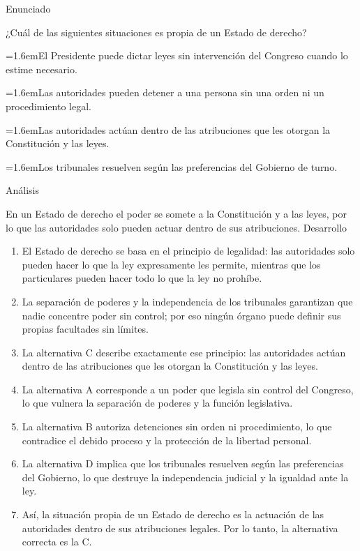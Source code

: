\documentclass[10pt,a4paper,twocolumn]{article}
\newcommand{\alternativa}[2]{\par\noindent\hangindent=1.6em\hangafter=1\makebox[1.6em][l]{\tecla{#1}}#2\par}
\newcommand{\clave}[1]{\par\smallskip{\sffamily\footnotesize\color{esmeralda} Clave \teclaok{#1}}\par}
\begin{document}
\begin{ejemplo}
{\sffamily\footnotesize\color{zinc500} Enunciado}\par
¿Cuál de las siguientes situaciones es propia de un Estado de derecho?
\alternativa{A}{El Presidente puede dictar leyes sin intervención del Congreso cuando lo estime necesario.}
\alternativa{B}{Las autoridades pueden detener a una persona sin una orden ni un procedimiento legal.}
\alternativa{C}{Las autoridades actúan dentro de las atribuciones que les otorgan la Constitución y las leyes.}
\alternativa{D}{Los tribunales resuelven según las preferencias del Gobierno de turno.}
\clave{C}
{\sffamily\footnotesize\color{zinc500} Análisis}\par En un Estado de derecho el poder se somete a la Constitución y a las leyes, por lo que las autoridades solo pueden actuar dentro de sus atribuciones.
{\sffamily\footnotesize\color{zinc500} Desarrollo}
\begin{enumerate}
  \item El Estado de derecho se basa en el principio de legalidad: las autoridades solo pueden hacer lo que la ley expresamente les permite, mientras que los particulares pueden hacer todo lo que la ley no prohíbe.
  \item La separación de poderes y la independencia de los tribunales garantizan que nadie concentre poder sin control; por eso ningún órgano puede definir sus propias facultades sin límites.
  \item La alternativa C describe exactamente ese principio: las autoridades actúan dentro de las atribuciones que les otorgan la Constitución y las leyes.
  \item La alternativa A corresponde a un poder que legisla sin control del Congreso, lo que vulnera la separación de poderes y la función legislativa.
  \item La alternativa B autoriza detenciones sin orden ni procedimiento, lo que contradice el debido proceso y la protección de la libertad personal.
  \item La alternativa D implica que los tribunales resuelven según las preferencias del Gobierno, lo que destruye la independencia judicial y la igualdad ante la ley.
  \item Así, la situación propia de un Estado de derecho es la actuación de las autoridades dentro de sus atribuciones legales. Por lo tanto, la alternativa correcta es la C.
\end{enumerate}
\end{ejemplo}
\end{document}

